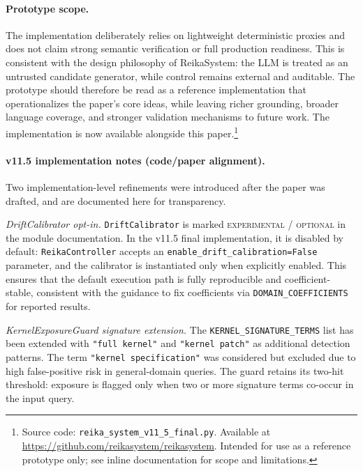 \documentclass[11pt,a4paper]{article}
\begin{document}
\paragraph{Prototype scope.}
The implementation deliberately relies on lightweight deterministic proxies
and does not claim strong semantic verification or full production readiness.
This is consistent with the design philosophy of ReikaSystem: the LLM is
treated as an untrusted candidate generator, while control remains external
and auditable.
The prototype should therefore be read as a reference implementation that
operationalizes the paper's core ideas, while leaving richer grounding,
broader language coverage, and stronger validation mechanisms to future work.
The implementation is now available alongside this paper.\footnote{
  Source code: \texttt{reika\_system\_v11\_5\_final.py}.
  Available at \url{https://github.com/reikasystem/reikasystem}.
  Intended for use as a reference prototype only;
  see inline documentation for scope and limitations.
}

\paragraph{v11.5 implementation notes (code/paper alignment).}
Two implementation-level refinements were introduced after the paper was drafted,
and are documented here for transparency.

\textit{DriftCalibrator opt-in.}
\texttt{DriftCalibrator} is marked \textsc{experimental / optional} in the module
documentation. In the v11.5 final implementation, it is disabled by default:
\texttt{ReikaController} accepts an \texttt{enable\_drift\_calibration=False}
parameter, and the calibrator is instantiated only when explicitly enabled.
This ensures that the default execution path is fully reproducible and
coefficient-stable, consistent with the guidance to fix coefficients via
\texttt{DOMAIN\_COEFFICIENTS} for reported results.

\textit{KernelExposureGuard signature extension.}
The \texttt{KERNEL\_SIGNATURE\_TERMS} list has been extended with
\texttt{"full kernel"} and \texttt{"kernel patch"} as additional detection
patterns. The term \texttt{"kernel specification"} was considered but excluded
due to high false-positive risk in general-domain queries.
The guard retains its two-hit threshold: exposure is flagged only when two or
more signature terms co-occur in the input query.
\end{document}
